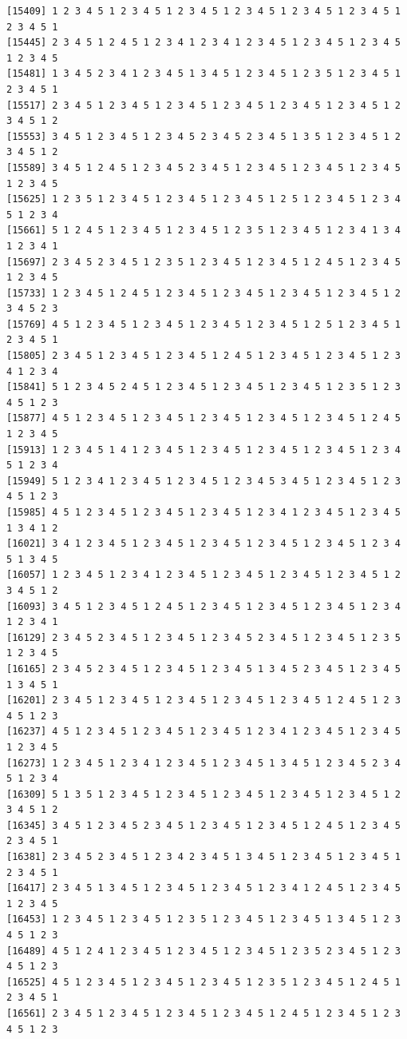 \documentclass[
  11pt,
]{book}
\begin{document}
\begin{verbatim}
[15409] 1 2 3 4 5 1 2 3 4 5 1 2 3 4 5 1 2 3 4 5 1 2 3 4 5 1 2 3 4 5 1 2 3 4 5 1
[15445] 2 3 4 5 1 2 4 5 1 2 3 4 1 2 3 4 1 2 3 4 5 1 2 3 4 5 1 2 3 4 5 1 2 3 4 5
[15481] 1 3 4 5 2 3 4 1 2 3 4 5 1 3 4 5 1 2 3 4 5 1 2 3 5 1 2 3 4 5 1 2 3 4 5 1
[15517] 2 3 4 5 1 2 3 4 5 1 2 3 4 5 1 2 3 4 5 1 2 3 4 5 1 2 3 4 5 1 2 3 4 5 1 2
[15553] 3 4 5 1 2 3 4 5 1 2 3 4 5 2 3 4 5 2 3 4 5 1 3 5 1 2 3 4 5 1 2 3 4 5 1 2
[15589] 3 4 5 1 2 4 5 1 2 3 4 5 2 3 4 5 1 2 3 4 5 1 2 3 4 5 1 2 3 4 5 1 2 3 4 5
[15625] 1 2 3 5 1 2 3 4 5 1 2 3 4 5 1 2 3 4 5 1 2 5 1 2 3 4 5 1 2 3 4 5 1 2 3 4
[15661] 5 1 2 4 5 1 2 3 4 5 1 2 3 4 5 1 2 3 5 1 2 3 4 5 1 2 3 4 1 3 4 1 2 3 4 1
[15697] 2 3 4 5 2 3 4 5 1 2 3 5 1 2 3 4 5 1 2 3 4 5 1 2 4 5 1 2 3 4 5 1 2 3 4 5
[15733] 1 2 3 4 5 1 2 4 5 1 2 3 4 5 1 2 3 4 5 1 2 3 4 5 1 2 3 4 5 1 2 3 4 5 2 3
[15769] 4 5 1 2 3 4 5 1 2 3 4 5 1 2 3 4 5 1 2 3 4 5 1 2 5 1 2 3 4 5 1 2 3 4 5 1
[15805] 2 3 4 5 1 2 3 4 5 1 2 3 4 5 1 2 4 5 1 2 3 4 5 1 2 3 4 5 1 2 3 4 1 2 3 4
[15841] 5 1 2 3 4 5 2 4 5 1 2 3 4 5 1 2 3 4 5 1 2 3 4 5 1 2 3 5 1 2 3 4 5 1 2 3
[15877] 4 5 1 2 3 4 5 1 2 3 4 5 1 2 3 4 5 1 2 3 4 5 1 2 3 4 5 1 2 4 5 1 2 3 4 5
[15913] 1 2 3 4 5 1 4 1 2 3 4 5 1 2 3 4 5 1 2 3 4 5 1 2 3 4 5 1 2 3 4 5 1 2 3 4
[15949] 5 1 2 3 4 1 2 3 4 5 1 2 3 4 5 1 2 3 4 5 3 4 5 1 2 3 4 5 1 2 3 4 5 1 2 3
[15985] 4 5 1 2 3 4 5 1 2 3 4 5 1 2 3 4 5 1 2 3 4 1 2 3 4 5 1 2 3 4 5 1 3 4 1 2
[16021] 3 4 1 2 3 4 5 1 2 3 4 5 1 2 3 4 5 1 2 3 4 5 1 2 3 4 5 1 2 3 4 5 1 3 4 5
[16057] 1 2 3 4 5 1 2 3 4 1 2 3 4 5 1 2 3 4 5 1 2 3 4 5 1 2 3 4 5 1 2 3 4 5 1 2
[16093] 3 4 5 1 2 3 4 5 1 2 4 5 1 2 3 4 5 1 2 3 4 5 1 2 3 4 5 1 2 3 4 1 2 3 4 1
[16129] 2 3 4 5 2 3 4 5 1 2 3 4 5 1 2 3 4 5 2 3 4 5 1 2 3 4 5 1 2 3 5 1 2 3 4 5
[16165] 2 3 4 5 2 3 4 5 1 2 3 4 5 1 2 3 4 5 1 3 4 5 2 3 4 5 1 2 3 4 5 1 3 4 5 1
[16201] 2 3 4 5 1 2 3 4 5 1 2 3 4 5 1 2 3 4 5 1 2 3 4 5 1 2 4 5 1 2 3 4 5 1 2 3
[16237] 4 5 1 2 3 4 5 1 2 3 4 5 1 2 3 4 5 1 2 3 4 1 2 3 4 5 1 2 3 4 5 1 2 3 4 5
[16273] 1 2 3 4 5 1 2 3 4 1 2 3 4 5 1 2 3 4 5 1 3 4 5 1 2 3 4 5 2 3 4 5 1 2 3 4
[16309] 5 1 3 5 1 2 3 4 5 1 2 3 4 5 1 2 3 4 5 1 2 3 4 5 1 2 3 4 5 1 2 3 4 5 1 2
[16345] 3 4 5 1 2 3 4 5 2 3 4 5 1 2 3 4 5 1 2 3 4 5 1 2 4 5 1 2 3 4 5 2 3 4 5 1
[16381] 2 3 4 5 2 3 4 5 1 2 3 4 2 3 4 5 1 3 4 5 1 2 3 4 5 1 2 3 4 5 1 2 3 4 5 1
[16417] 2 3 4 5 1 3 4 5 1 2 3 4 5 1 2 3 4 5 1 2 3 4 1 2 4 5 1 2 3 4 5 1 2 3 4 5
[16453] 1 2 3 4 5 1 2 3 4 5 1 2 3 5 1 2 3 4 5 1 2 3 4 5 1 3 4 5 1 2 3 4 5 1 2 3
[16489] 4 5 1 2 4 1 2 3 4 5 1 2 3 4 5 1 2 3 4 5 1 2 3 5 2 3 4 5 1 2 3 4 5 1 2 3
[16525] 4 5 1 2 3 4 5 1 2 3 4 5 1 2 3 4 5 1 2 3 5 1 2 3 4 5 1 2 4 5 1 2 3 4 5 1
[16561] 2 3 4 5 1 2 3 4 5 1 2 3 4 5 1 2 3 4 5 1 2 4 5 1 2 3 4 5 1 2 3 4 5 1 2 3

\end{verbatim}
\end{document}
